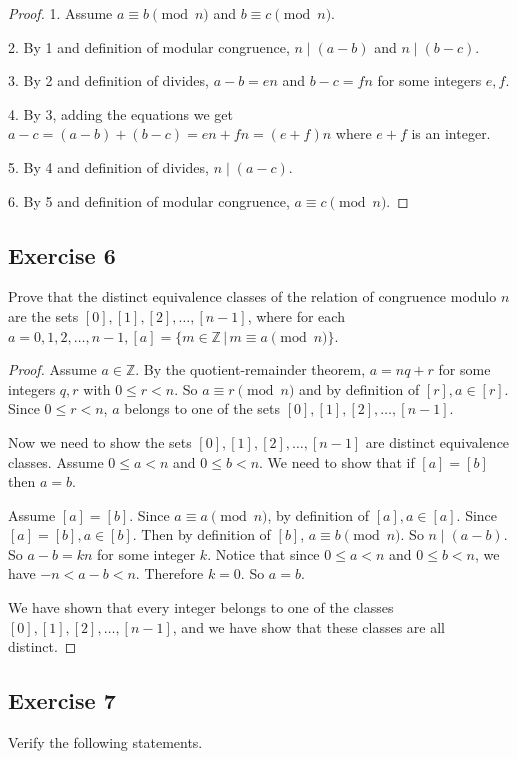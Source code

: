 \documentclass[14pt]{extarticle}
\newcommand{\Z}{\mathbb{Z}}
\begin{document}
\begin{proof}
1. Assume \(a \equiv b \pmod n\) and \(b \equiv c \pmod n\).

2. By 1 and definition of modular congruence, \(n \mid (a-b)\) and \(n \mid (b-c)\).

3. By 2 and definition of divides, \(a-b = en\) and \(b-c = fn\) for some integers \(e,f\).

4. By 3, adding the equations we get \(a-c = (a-b)+(b-c) = en + fn = (e+f)n\) where \(e+f\) is an integer.

5. By 4 and definition of divides, \(n \mid (a-c)\).

6. By 5 and definition of modular congruence, \(a \equiv c \pmod n\).
\end{proof}

\subsection{Exercise 6}
Prove that the distinct equivalence classes of the relation of congruence modulo \(n\) are the sets \([0], [1], [2], 
\ldots, [n - 1]\), where for each \(a = 0, 1, 2, \ldots, n - 1, [a] = \{m \in \Z \,|\, m \equiv a \pmod n\}\).

\begin{proof}
Assume \(a \in \Z\). By the quotient-remainder theorem, \(a = nq + r\) for some integers \(q,r\) with \(0 \leq r < n\).
So \(a \equiv r \pmod n\) and by definition of \([r], a \in [r]\). Since \(0 \leq r < n\), $a$ belongs to one of the 
sets \([0], [1], [2], \ldots, [n - 1]\).

Now we need to show the sets \([0], [1], [2], \ldots, [n - 1]\) are distinct equivalence classes. Assume \(0\leq a<n\)
and \(0 \leq b < n\). We need to show that if \([a] = [b]\) then \(a = b\). 

Assume \([a] = [b]\). Since \(a \equiv a \pmod n\), by definition of \([a], a \in [a]\). Since \([a] = [b], a \in [b]\). Then by definition of \([b]\), \(a \equiv b \pmod n\). So \(n \mid (a-b)\). So \(a-b = kn\) for some integer $k$. Notice that since \(0\leq a < n\) and \(0 \leq b < n\), we have \(-n < a-b < n\). Therefore $k=0$. So $a=b$.

We have shown that every integer belongs to one of the classes \([0], [1], [2], \ldots, [n-1]\), and we have show 
that these classes are all distinct.
\end{proof}

\subsection{Exercise 7}
Verify the following statements.
\end{document}
